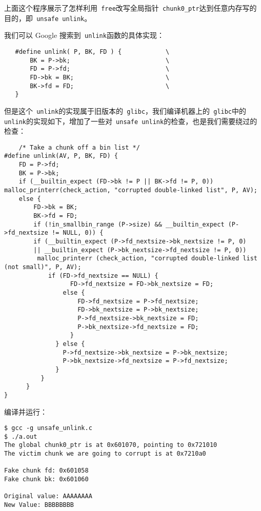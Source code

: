 上面这个程序展示了怎样利用\verb+ free+改写全局指针\verb+ chunk0_ptr+达到任意内存写的目的，即\verb+ unsafe unlink+。

我们可以 Google 搜索到\verb+ unlink+函数的具体实现：
\begin{verbatim}
   #define unlink( P, BK, FD ) {            \
       BK = P->bk;                          \
       FD = P->fd;                          \
       FD->bk = BK;                         \
       BK->fd = FD;                         \
   }
\end{verbatim}

但是这个\verb+ unlink+的实现属于旧版本的\verb+ glibc+，我们编译机器上的\verb+ glibc+中的\verb+ unlink+的实现如下，增加了一些对\verb+ unsafe unlink+的检查，也是我们需要绕过的检查：
\begin{verbatim}
    /* Take a chunk off a bin list */
#define unlink(AV, P, BK, FD) {
    FD = P->fd;
    BK = P->bk;
    if (__builtin_expect (FD->bk != P || BK->fd != P, 0)) malloc_printerr(check_action, "corrupted double-linked list", P, AV);
    else {
        FD->bk = BK;
        BK->fd = FD;
        if (!in_smallbin_range (P->size) && __builtin_expect (P->fd_nextsize != NULL, 0)) {
        if (__builtin_expect (P->fd_nextsize->bk_nextsize != P, 0)
        || __builtin_expect (P->bk_nextsize->fd_nextsize != P, 0))
         malloc_printerr (check_action, "corrupted double-linked list (not small)", P, AV);
            if (FD->fd_nextsize == NULL) {
                  FD->fd_nextsize = FD->bk_nextsize = FD;
                else {
                    FD->fd_nextsize = P->fd_nextsize;
                    FD->bk_nextsize = P->bk_nextsize;
                    P->fd_nextsize->bk_nextsize = FD;
                    P->bk_nextsize->fd_nextsize = FD;
                  }
              } else {
                P->fd_nextsize->bk_nextsize = P->bk_nextsize;
                P->bk_nextsize->fd_nextsize = P->fd_nextsize;
              }
          }
      }
}
\end{verbatim}

编译并运行：
\begin{verbatim}
$ gcc -g unsafe_unlink.c 
$ ./a.out 
The global chunk0_ptr is at 0x601070, pointing to 0x721010
The victim chunk we are going to corrupt is at 0x7210a0

Fake chunk fd: 0x601058
Fake chunk bk: 0x601060

Original value: AAAAAAAA
New Value: BBBBBBBB
\end{verbatim}

